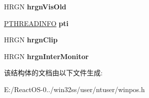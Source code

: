 \begin{DoxyCompactItemize}
H\+R\+GN {\bfseries hrgn\+Vis\+Old}
\item 
\mbox{\label{struct___c_v_r_ad23603b79828af239330adbfefe78e63}} 
\hyperlink{struct___t_h_r_e_a_d_i_n_f_o}{P\+T\+H\+R\+E\+A\+D\+I\+N\+FO} {\bfseries pti}
\item 
\mbox{\label{struct___c_v_r_a9ad94c071eb41ea93161fc1e715f2c22}} 
H\+R\+GN {\bfseries hrgn\+Clip}
\item 
\mbox{\label{struct___c_v_r_ac239397e90e816209146d6f1c3c91b17}} 
H\+R\+GN {\bfseries hrgn\+Inter\+Monitor}
\end{DoxyCompactItemize}


该结构体的文档由以下文件生成\+:\begin{DoxyCompactItemize}
\item 
E\+:/\+React\+O\+S-\/0../win32ss/user/ntuser/winpos.\+h\end{DoxyCompactItemize}

